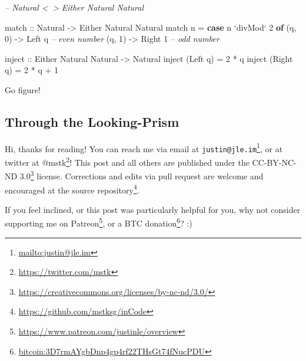 \documentclass[]{article}
\newenvironment{Shaded}{}{}
\newcommand{\CommentTok}[1]{\textcolor[rgb]{0.38,0.63,0.69}{\textit{#1}}}
\newcommand{\DataTypeTok}[1]{\textcolor[rgb]{0.56,0.13,0.00}{#1}}
\newcommand{\DecValTok}[1]{\textcolor[rgb]{0.25,0.63,0.44}{#1}}
\newcommand{\FunctionTok}[1]{\textcolor[rgb]{0.02,0.16,0.49}{#1}}
\newcommand{\KeywordTok}[1]{\textcolor[rgb]{0.00,0.44,0.13}{\textbf{#1}}}
\newcommand{\NormalTok}[1]{#1}
\newcommand{\OtherTok}[1]{\textcolor[rgb]{0.00,0.44,0.13}{#1}}
\renewcommand{\href}[2]{#2\footnote{\url{#1}}}
\begin{document}
\begin{Shaded}
\begin{Highlighting}[]
\CommentTok{-- Natural <~> Either Natural Natural}

\OtherTok{match ::} \DataTypeTok{Natural} \OtherTok{->} \DataTypeTok{Either} \DataTypeTok{Natural} \DataTypeTok{Natural}
\NormalTok{match n }\FunctionTok{=} \KeywordTok{case}\NormalTok{ n }\OtherTok{`divMod`} \DecValTok{2} \KeywordTok{of}
\NormalTok{    (q, }\DecValTok{0}\NormalTok{) }\OtherTok{->} \DataTypeTok{Left}\NormalTok{  q       }\CommentTok{-- even number}
\NormalTok{    (q, }\DecValTok{1}\NormalTok{) }\OtherTok{->} \DataTypeTok{Right} \DecValTok{1}       \CommentTok{-- odd number}

\OtherTok{inject ::} \DataTypeTok{Either} \DataTypeTok{Natural} \DataTypeTok{Natural} \OtherTok{->} \DataTypeTok{Natural}
\NormalTok{inject (}\DataTypeTok{Left}\NormalTok{  q) }\FunctionTok{=} \DecValTok{2} \FunctionTok{*}\NormalTok{ q}
\NormalTok{inject (}\DataTypeTok{Right}\NormalTok{ q) }\FunctionTok{=} \DecValTok{2} \FunctionTok{*}\NormalTok{ q }\FunctionTok{+} \DecValTok{1}
\end{Highlighting}
\end{Shaded}

Go figure!

\hypertarget{through-the-looking-prism}{%
\subsection{Through the Looking-Prism}\label{through-the-looking-prism}}

Hi, thanks for reading! You can reach me via email at
\href{mailto:justin@jle.im}{\nolinkurl{justin@jle.im}}, or at twitter at
\href{https://twitter.com/mstk}{@mstk}! This post and all others are published
under the \href{https://creativecommons.org/licenses/by-nc-nd/3.0/}{CC-BY-NC-ND
3.0} license. Corrections and edits via pull request are welcome and encouraged
at \href{https://github.com/mstksg/inCode}{the source repository}.

If you feel inclined, or this post was particularly helpful for you, why not
consider \href{https://www.patreon.com/justinle/overview}{supporting me on
Patreon}, or a \href{bitcoin:3D7rmAYgbDnp4gp4rf22THsGt74fNucPDU}{BTC donation}?
:)
\end{document}
